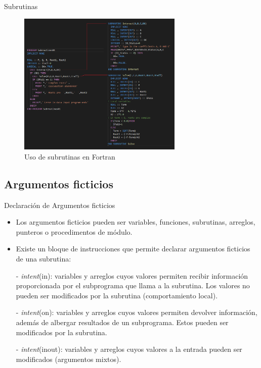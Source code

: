 \begin{frame}[fragile]{Subrutinas}
  \vspace{5cm}
  \begin{figure}
    \includegraphics[width=0.7\textwidth]{./resources/subroutines.png}
    \caption*{Uso de subrutinas en Fortran}
  \end{figure}
\end{frame}


\subsection{Argumentos ficticios}


\begin{frame}[fragile]{Declaración de Argumentos ficticios}
 \begin{itemize}[<+(0)->]
  \item Los argumentos ficticios pueden ser variables, funciones, subrutinas, arreglos, punteros o procedimentos de módulo.
  \item Existe un bloque de instrucciones que permite declarar argumentos ficticios de una subrutina:
  \item [-] \emph{intent}(in): variables y arreglos cuyos valores permiten recibir información proporcionada por el subprograma que llama a la subrutina. Los valores no pueden ser modificados por la subrutina (comportamiento local).
  \item [-] \emph{intent}(on): variables y arreglos cuyos valores permiten devolver información, además de albergar resultados de un subprograma. Estos pueden ser modificados por la subrutina.
  \item [-] \emph{intent}(inout): variables y arreglos cuyos valores a la entrada pueden ser modificados (argumentos mixtos).
 \end{itemize}
\end{frame}

